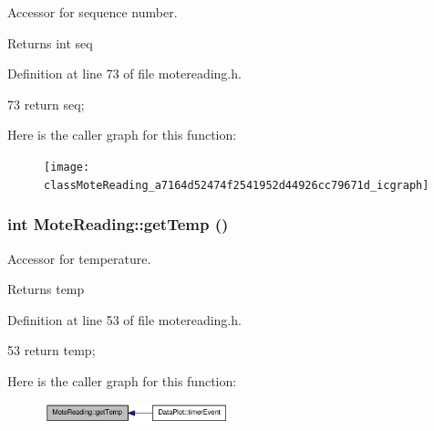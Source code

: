 Accessor for sequence number. 

\begin{DoxyReturn}{Returns}
int seq 
\end{DoxyReturn}


Definition at line 73 of file motereading.h.




\begin{DoxyCode}
73 { return seq; }
\end{DoxyCode}




Here is the caller graph for this function:\nopagebreak
\begin{figure}[H]
\begin{center}
\leavevmode
\texttt{[image: classMoteReading\_a7164d52474f2541952d44926cc79671d\_icgraph]}
\end{center}
\end{figure}


\hypertarget{classMoteReading_a3f7526c29f2bf61feeb5e24298133332}{
\subsubsection[{getTemp}]{\setlength{\rightskip}{0pt plus 5cm}int MoteReading::getTemp ()}}
\label{classMoteReading_a3f7526c29f2bf61feeb5e24298133332}


Accessor for temperature. 

\begin{DoxyReturn}{Returns}
temp 
\end{DoxyReturn}


Definition at line 53 of file motereading.h.




\begin{DoxyCode}
53 { return temp; }
\end{DoxyCode}




Here is the caller graph for this function:\nopagebreak
\begin{figure}[H]
\begin{center}
\leavevmode
\includegraphics[width=152pt]{classMoteReading_a3f7526c29f2bf61feeb5e24298133332_icgraph}
\end{center}
\end{figure}


